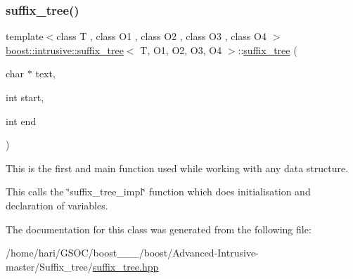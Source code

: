 \subsubsection{\texorpdfstring{suffix\+\_\+tree()}{suffix\_tree()}}
{\footnotesize\ttfamily template$<$class T , class O1 , class O2 , class O3 , class O4 $>$ \\
\hyperlink{classboost_1_1intrusive_1_1suffix__tree}{boost\+::intrusive\+::suffix\+\_\+tree}$<$ T, O1, O2, O3, O4 $>$\+::\hyperlink{classboost_1_1intrusive_1_1suffix__tree}{suffix\+\_\+tree} (\begin{DoxyParamCaption}\item[{char $\ast$}]{text,  }\item[{int}]{start,  }\item[{int}]{end }\end{DoxyParamCaption})\hspace{0.3cm}{\ttfamily [inline]}}


\begin{DoxyItemize}
\item This is the first and main function used while working with any data structure. 
\item This calls the \char`\"{}suffix\+\_\+tree\+\_\+impl\char`\"{} function which does initialisation and declaration of variables. 
\end{DoxyItemize}

The documentation for this class was generated from the following file\+:\begin{DoxyCompactItemize}
\item 
/home/hari/\+G\+S\+O\+C/boost\+\_\+\_\+\_/boost/\+Advanced-\/\+Intrusive-\/master/\+Suffix\+\_\+tree/\hyperlink{suffix__tree_8hpp}{suffix\+\_\+tree.\+hpp}\end{DoxyCompactItemize}
